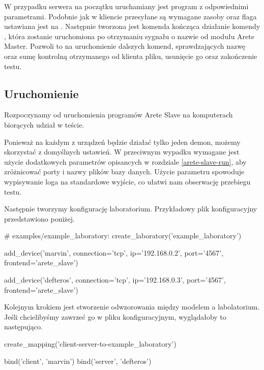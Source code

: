 \documentclass[00-praca-magisterska.tex]{subfiles}
\begin{document}
W przypadku serwera na początku uruchamiany jest program  z
odpowiednimi parametrami. Podobnie jak w kliencie przesyłane są wymagane zasoby
oraz flaga  ustawiana jest na . Następnie
tworzona jest komenda kończąca działanie komendy , która zostanie
uruchomiona po otrzymaniu sygnału o nazwie  od modułu Arete
Master. Pozwoli to na uruchomienie dalszych komend, sprawdzających nazwę oraz
sumę kontrolną otrzymanego od klienta pliku, usunięcie go oraz zakończenie
testu.

\subsection{Uruchomienie}


Rozpoczynamy od uruchomienia programów Arete Slave na komputerach biorących
udział w teście.


Ponieważ na każdym z urządzeń będzie działać tylko jeden demon, możemy
skorzystać z domyślnych ustawień. W przeciwnym wypadku wymagane jest użycie
dodatkowych parametrów opisancych w rozdziale \ref{arete-slave-run}, aby
zróżnicować porty i nazwy plików bazy danych. Użycie parametru 
spowoduje wypisywanie loga na standardowe wyjście, co ułatwi nam obserwację
przebiegu testu.

Następnie tworzymy konfigurację laboratorium. Przykładowy plik konfiguracyjny
przedstawiono poniżej.

\begin{pythoncode}
  # examples/example_laboratory:
  create_laboratory('example_laboratory')

  add_device('marvin',
      connection='tcp',
      ip='192.168.0.2',
      port='4567',
      frontend='arete_slave')

  add_device('defteros',
      connection='tcp',
      ip='192.168.0.3',
      port='4567',
      frontend='arete_slave')
\end{pythoncode}

Kolejnym krokiem jest stworzenie odwzorowania między modelem a labolatorium.
Jeśli chcielibyśmy zawrzeć go w pliku konfiguracyjnym, wyglądałoby to
następująco.

\begin{pythoncode}
  create_mapping('client-server-to-example_laboratory')

  bind('client', 'marvin')
  bind('server', 'defteros')
\end{pythoncode}
\end{document}
